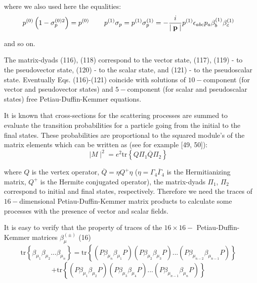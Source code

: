 \documentclass[a4paper,12pt]{article}
\begin{document}
where we also used here the equalities:
\[
p^{(0)}\left( 1-\sigma _p^{(0)2}\right) =p^{(0)}\hspace{0.3in}p^{(1)}\sigma
_p=p^{(1)}\sigma _p^{(1)}=-\frac i{\mid \mathbf{p}\mid }p^{(1)}\epsilon
_{abc}p_a\beta _b^{(1)}\beta _c^{(1)}
\]

and so on.

The matrix-dyads (116), (118) correspond to the vector state,
(117), (119) - to the pseudovector state, (120) - to the scalar
state, and (121) - to the pseudoscalar state. Eventually Eqs.
(116)-(121) coincide with solutions of $ 10-$component (for vector
and pseudovector states) and $5-$component (for scalar and
pseudoscalar states) free Petiau-Duffin-Kemmer equations.

It is known that cross-sections for the scattering processes are summed to
evaluate the transition probabilities for a particle going from the initial
to the final states. These probabilities are proportional to the squared
module's of the matrix elements which can be written as (see for example
[49, 50]):
\begin{equation}
\mid M\mid ^2=e^2\mbox{tr}\left\{ Q\Pi _1\overline{Q}\Pi
_2\right\} \label{122}
\end{equation}

where $Q$ is the vertex operator, $\overline{Q}=\eta Q^{+}\eta $
($\eta =\Gamma _4\overline{\Gamma }_4$ is the Hermitianizing
matrix, $Q^{+}$ is the Hermite conjugated operator), the
matrix-dyads $\Pi _1$, $\Pi _2$ correspond to initial and final
states, respectively. Therefore we need the traces of $
16-$dimensional Petiau-Duffin-Kemmer matrix products to calculate
some processes with the presence of vector and scalar fields.

It is easy to verify that the property of traces of the $16\times 16-$
Petiau-Duffin-Kemmer matrices $\beta _\mu ^{(\pm )}$ (16)
\[
\mbox{tr}\left\{ \beta _{\mu _1}\beta _{\mu _2}...\beta _{\mu
_n}\right\} = \mbox{tr}\left\{ \left( P\beta _{\mu _n}\beta _{\mu
_1}P\right) \left( P\beta _{\mu _2}\beta _{\mu _3}P\right)
...\left( P\beta _{\mu _{n-2}}\beta _{\mu _{n-1}}P\right) \right\}
\]
\begin{equation}
+\mbox{tr}\left\{ \left( P\beta _{\mu _1}\beta _{\mu _2}P\right)
\left( P\beta _{\mu _3}\beta _{\mu _4}P\right) ...\left( P\beta
_{\mu _{n-1}}\beta _{\mu _n}P\right) \right\}  \label{123}
\end{equation}
\end{document}

